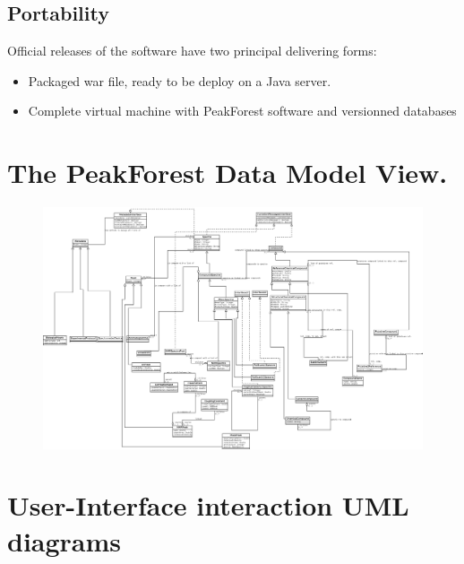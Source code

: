 \subsection{Portability}

Official releases of the software have two principal delivering forms: 
\begin{itemize}
	\item Packaged war file, ready to be deploy on a Java server.
	\item Complete virtual machine with PeakForest software and versionned databases
\end{itemize}




\newpage
\newpage


\appendix
{}
\setcounter{page}{1}

\makeatletter
\def\@seccntformat#1{Appendix~\csname the#1\endcsname:\quad}
\makeatother

\section{The PeakForest Data Model View.}
\label{AppendixDataModel}

\begin{figure}[h!]
	\centerline{\includegraphics[width=23cm, angle =270]{files/images/peakforest_data-model.png}}
	\label{PeakForestDataModelView}
\end{figure}


\section{User-Interface interaction UML diagrams}
\label{AppendixUMLDia}

